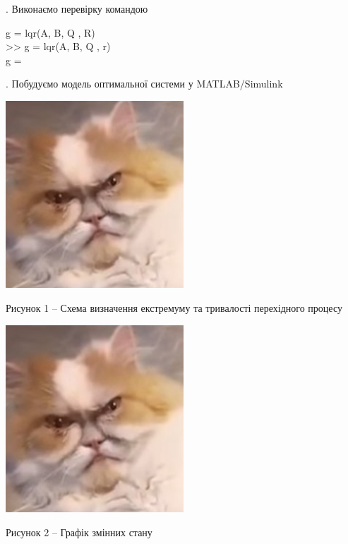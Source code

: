 \documentclass[a4paper]{article}
\begin{document}
\hfill \break
{}. Виконаємо перевірку командою\\
\begin{center}
g = lqr(A, B, Q , R)\\
\hfill \break
>> g = lqr(A, B, Q , r)\\
\hfill \break
g = \big[ 0.1247 0.1754 \big] \\
\hfill \break
\end{center}

\hfill \break
{}. Побудуємо модель оптимальної системи у MATLAB/Simulink\\
\begin{center}
\includegraphics[width=0.5\textwidth]{simulinkModel}
\end{center}
\begin{center}
Рисунок 1 – Схема визначення екстремуму та тривалості перехідного процесу\\
\end{center}
\begin{center}
\includegraphics[width=0.5\textwidth]{simulinkPlot}
\end{center}
\begin{center}
Рисунок 2 – Графік змінних стану\\
\end{center}
\end{document}
